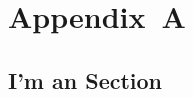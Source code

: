 \documentclass{book}
\begin{document}
\chapter{Appendix~A}

\lipsum[1-5]
\section{I'm an Section}
\lipsum[6-12]
\end{document}
